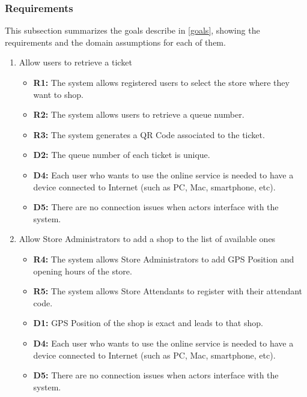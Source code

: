 \documentclass[table, 12pt]{article}
\begin{document}
\begin{flushleft}

    \subsubsection{Requirements}
    This subsection summarizes the goals describe in \ref{goals}, showing the requirements and the domain assumptions for each of them.


    \begin{enumerate}[label=\textbf{-G\arabic*}:]
        \item {Allow users to retrieve a ticket
              \begin{itemize}
                  \item \textbf{R1:} The system allows registered users to select the store where they want to shop.
                  \item \textbf{R2:} The system allows users to retrieve a queue number.
                  \item \textbf{R3:} The system generates a QR Code associated to the ticket.
                  \item \textbf{D2:} The queue number of each ticket is unique.
                  \item \textbf{D4:} Each user who wants to use the online service is needed to have a device connected to Internet (such as PC, Mac, smartphone, etc).
                  \item \textbf{D5:} There are no connection issues when actors interface with the system.
              \end{itemize}
              }
        \item {Allow Store Administrators to add a shop to the list of available ones
              \begin{itemize}
                  \item\textbf{R4:} The system allows Store Administrators to add GPS Position and opening hours of the store.
                  \item \textbf{R5:} The system allows Store Attendants to register with their attendant code.
                  \item \textbf{D1:} GPS Position of the shop is exact and leads to that shop.
                  \item \textbf{D4:} Each user who wants to use the online service is needed to have a device connected to Internet (such as PC, Mac, smartphone, etc).
                  \item \textbf{D5:} There are no connection issues when actors interface with the system.

\end{itemize}}
\end{enumerate}
\end{flushleft}
\end{document}
